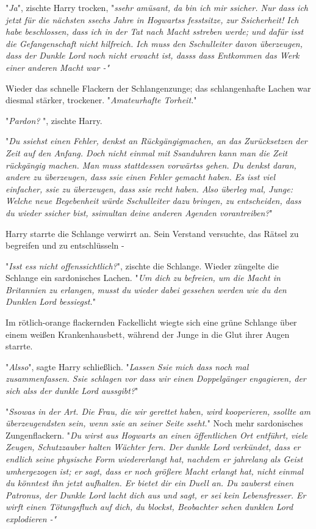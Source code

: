 {"\emph{Ja}", zischte Harry trocken, "\emph{ssehr amüsant, da bin ich mir ssicher. Nur dass ich jetzt für die nächsten ssechs Jahre in Hogwartss fesstsitze, zur Ssicherheit! Ich habe beschlossen, dass ich in der Tat nach Macht sstreben werde; und dafür isst die Gefangenschaft nicht hilfreich. Ich muss den Sschulleiter davon überzeugen, dass der Dunkle Lord noch nicht erwacht ist, dasss dass Entkommen das Werk einer anderen Macht war -"}

Wieder das schnelle Flackern der Schlangenzunge; das schlangenhafte Lachen war diesmal stärker, trockener. "\emph{Amateurhafte Torheit.}"

"\emph{Pardon?} ", zischte Harry.

"\emph{Du ssiehst einen Fehler, denkst an Rückgängigmachen, an das Zurücksetzen der Zeit auf den Anfang. Doch nicht einmal mit Ssanduhren kann man die Zeit rückgängig machen. Man muss stattdessen vorwärtss gehen. Du denkst daran, andere zu überzeugen, dass ssie einen Fehler gemacht haben. Es isst viel einfacher, ssie zu überzeugen, dass ssie recht haben. Also überleg mal, Junge: Welche neue Begebenheit würde Sschulleiter dazu bringen, zu entscheiden, dass du wieder ssicher bist, ssimultan deine anderen Agenden vorantreiben?}"

Harry starrte die Schlange verwirrt an. Sein Verstand versuchte, das Rätsel zu begreifen und zu entschlüsseln -

"\emph{Isst ess nicht offenssichtlich?}", zischte die Schlange. Wieder züngelte die Schlange ein sardonisches Lachen. "\emph{Um dich zu befreien, um die Macht in Britannien zu erlangen, musst du wieder dabei gessehen werden wie du den Dunklen Lord bessiegst.}"

Im rötlich-orange flackernden Fackellicht wiegte sich eine grüne Schlange über einem weißen Krankenhausbett, während der Junge in die Glut ihrer Augen starrte.

"\emph{Alsso}", sagte Harry schließlich. "\emph{Lassen Ssie mich dass noch mal zusammenfassen. Ssie schlagen vor dass wir einen Doppelgänger engagieren, der sich alss der dunkle Lord aussgibt?}"

"\emph{Ssowas in der Art. Die Frau, die wir gerettet haben, wird kooperieren, ssollte am überzeugendsten sein, wenn ssie an seiner Seite sseht.}" Noch mehr sardonisches Zungenflackern. "\emph{Du wirst aus Hogwarts an einen öffentlichen Ort entführt, viele Zeugen, Schutzzauber halten Wächter fern. Der dunkle Lord verkündet, dass er endlich seine physische Form wiedererlangt hat, nachdem er jahrelang als Geist umhergezogen ist; er sagt, dass er noch größere Macht erlangt hat, nicht einmal du könntest ihn jetzt aufhalten. Er bietet dir ein Duell an. Du zauberst einen Patronus, der Dunkle Lord lacht dich aus und sagt, er sei kein Lebensfresser. Er wirft einen Tötungsfluch auf dich, du blockst, Beobachter sehen dunklen Lord explodieren -"}

}
